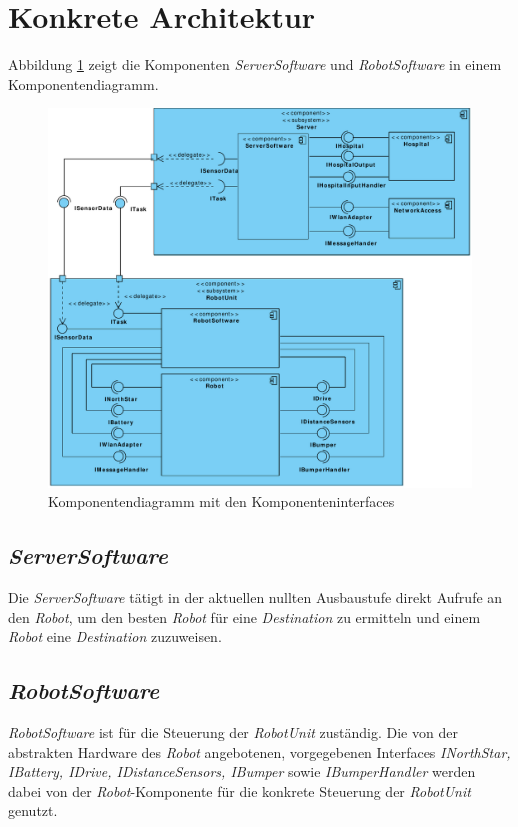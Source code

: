 \section{Konkrete Architektur}

Abbildung \ref{KomponentendiagrammKonkret} zeigt die Komponenten \emph{ServerSoftware} und \emph{RobotSoftware} in einem Komponentendiagramm.

\begin{figure}[H]
\centering
\includegraphics[width=1\textwidth]{img/1-Entwurf-4-KonkreteArchitektur}
\caption{Komponentendiagramm mit den Komponenteninterfaces}
\label{KomponentendiagrammKonkret}
\end{figure}

\subsection{\textit{ServerSoftware}}

Die \emph{ServerSoftware} tätigt in der aktuellen nullten Ausbaustufe direkt Aufrufe an den \textit{Robot},
um den besten \textit{Robot} für eine \textit{Destination} zu ermitteln und einem \textit{Robot} eine \textit{Destination} zuzuweisen.

\subsection{\textit{RobotSoftware}}

\emph{RobotSoftware} ist für die Steuerung der \textit{RobotUnit} zuständig. Die von der abstrakten Hardware
des \textit{Robot} angebotenen, vorgegebenen Interfaces \textit{INorthStar, IBattery, IDrive, IDistanceSensors, IBumper} sowie
\textit{IBumperHandler} werden dabei von der \textit{Robot}-Komponente für die konkrete Steuerung der \textit{RobotUnit} genutzt.
